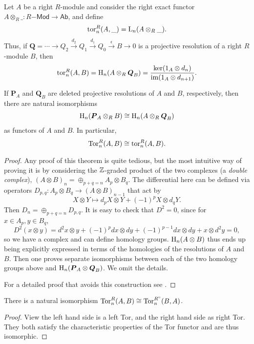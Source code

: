 \begin{defn}
    Let $A$ be a right $R$-module and consider the right exact functor $A\otimes_R \_:R\mathsf{-Mod}\to \mathsf{Ab}$, and define
    \[\operatorname{tor}_n^R(A,\_)=\mathrm{L}_n(A\otimes_R \_).\]
    Thus, if $\bm{Q}=\cdots\to Q_2\overset{d_2}{\to}Q_1\overset{d_1}{\to}Q_0\overset{\epsilon}{\to}B\to 0$ is a projective resolution of a right $R$-module $B$, then
    \[\operatorname{tor}_n^R(A,B)=\mathrm{H}_n(A\otimes_R\boldsymbol{Q}_B)=\frac{\ker(1_A\otimes d_n)}{\operatorname{im}(1_A\otimes d_{n+1})}.\]
\end{defn}

\begin{thm}\label{thm Tor=tor}
    If $\bm{P}_A$ and $\bm{Q}_B$ are deleted projective resolutions of $A$ and $B$, respectively, then there are natural isomorphisms
    \[\mathrm{H}_n(\boldsymbol{P}_A\otimes_R B)\cong \mathrm{H}_n(A\otimes_R \boldsymbol{Q}_B)\]
    as functors of $A$ and $B$. In particular,
    \[\operatorname{Tor}_n^R(A,B)\cong \operatorname{tor}_n^R(A,B).\]
\end{thm}
\begin{proof}
    Any proof of this theorem is quite tedious, but the most intuitive way of proving it is by considering the $\mathbb{Z}$-graded product of the two complexes (a \emph{double complex}), $(A\otimes B)_n=\oplus_{p+q=n}A_p\otimes B_q$. The differential here can be defined via operators $D_{p,q}:A_p\otimes B_q\to (A\otimes B)_{n-1}$ that act by
    \[X\otimes Y\mapsto d_pX\otimes Y+(-1)^pX\otimes d_qY.\]
    Then $D_n=\oplus_{p+q=n}D_{p,q}$. It is easy to check that $D^2=0$, since for $x\in A_p,y\in B_q$,
    \[D^2(x\otimes y)=d^2x\otimes y+(-1)^pdx\otimes dy+(-1)^{p-1}dx\otimes dy+x\otimes d^2y=0,\]
    so we have a complex and can define homology groups. $\mathrm{H}_n(A\otimes B)$ thus ends up being explicitly expressed in terms of the homologies of the resolutions of $A$ and $B$. Then one proves separate isomorphisms between each of the two homology groups above and $\mathrm{H}_n(\boldsymbol{P}_A\otimes \boldsymbol{Q}_B)$. We omit the details.

    For a detailed proof that avoids this construction see \cite[Thm.~6.32]{Rotman}.
\end{proof}


\begin{cor}
    There is a natural isomorphism $\operatorname{Tor}_n^R(A,B)\cong \operatorname{Tor}_n^{R^\circ}(B,A)$.
\end{cor}
\begin{proof}
    View the left hand side is a left Tor, and the right hand side as right Tor. They both satisfy the characteristic properties of the Tor functor and are thus isomorphic.
\end{proof}

